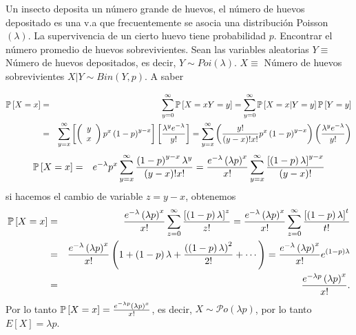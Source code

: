 \begin{Ejem} Un insecto deposita un n\'umero grande de huevos, el n\'umero de huevos depositado es una v.a que frecuentemente se asocia una distribuci\'on Poisson $\left(\lambda\right)$. La supervivencia de un cierto huevo tiene probabilidad $p$. Encontrar el n\'umero promedio de huevos sobrevivientes.
Sean las variables aleatorias
 $Y \equiv $ N\'umero de huevos depositados, es decir, $Y \sim Poi\left(\lambda\right)$. $X \equiv $ N\'umero de huevos sobrevivientes $X|Y \sim Bin\left(Y,p\right)$. A saber
 
 \begin{eqnarray*}
\mathbb{P} \left[X=x\right]&=& \sum_{y=0}^{\infty}\mathbb{P} \left[X=x   Y=y \right]= \sum_{y=0}^{\infty}\mathbb{P} \left[X=x | Y=y \right]\mathbb{P} \left[Y=y \right]\\
&=&\sum_{y=x}^{\infty} \left[ \left( 
\begin{array}{cc}
y \\ x
\end{array} \right) p^{x}\left(1-p\right)^{y-x}\right]\left[\frac{\lambda^{y}e^{-\lambda}}{y!}\right]=\sum_{y=x}^{\infty}\left( \frac{y!}{\left(y-x\right)! x!}p^{x}\left(1-p\right)^{y-x}\right)\left(\frac{\lambda^{y}e^{-\lambda}}{y!}\right)
\end{eqnarray*}
\begin{eqnarray*}
\mathbb{P} \left[X=x\right] &=&e^{-\lambda}p^{x}\sum_{y=x}^{\infty}\frac{\left(1-p\right)^{y-x}\lambda^{y}}{\left(y-x\right)!x!}=\frac{e^{-\lambda}\left(\lambda p\right)^{x}}{x!} \sum_{y=x}^{\infty}\frac{\left[\left(1-p\right)\lambda\right]^{y-x}}{\left(y-x\right)!}
\end{eqnarray*}
si hacemos el cambio de variable $z=y-x$, obtenemos
\begin{eqnarray*}
\mathbb{P} \left[X=x\right]&=& \frac{e^{-\lambda}\left(\lambda p\right)^{x}}{x!} \sum_{z=0}^{\infty}\frac{\left[\left(1-p\right)\lambda\right]^{z}}{z!}=\frac{e^{-\lambda}\left(\lambda p\right)^{x}}{x!}\sum_{z=0}^{\infty}\frac{\left[\left(1-p\right)\lambda\right]^{t}}{t!}\\
&=&\frac{e^{-\lambda}\left(\lambda p\right)^{x}}{x!} \left(1 + \left(1-p\right)\lambda + \frac{\left(\left(1-p\right)\lambda\right)^{2}}{2!}+ \cdots \right)=\frac{e^{-\lambda}\left(\lambda p\right)^{x}}{x!} e ^{\left(1-p\right)\lambda}\\
&=& \frac{e^{-\lambda p}\left(\lambda p\right)^{x}}{x!}.
\end{eqnarray*}
Por lo tanto 
$\mathbb{P}\left[X=x\right] = \frac{e^{-\lambda p}\left(\lambda p\right)^{x}}{x!}$, es decir, $X \sim \mathcal{P}o\left(\lambda p \right)$, por lo tanto $E\left[X\right] = \lambda p$.
\end{Ejem}

